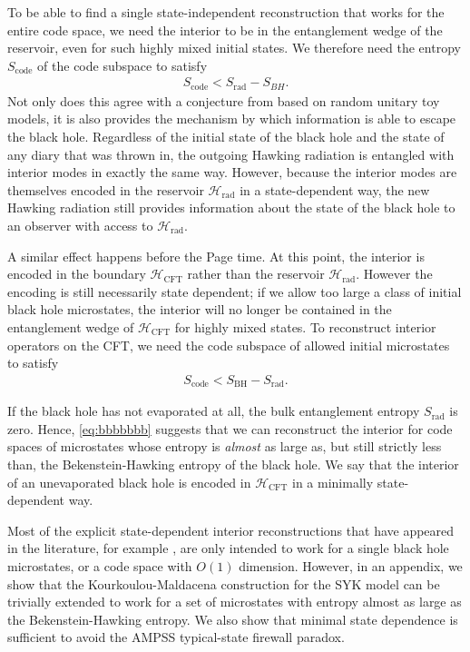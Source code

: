 \documentclass[11pt,a4paper]{article}
\newcommand{\Srad}{S_\text{rad} }
\begin{document}
To be able to find a single state-independent reconstruction that works for the entire code space, we need the interior to be in the entanglement wedge of the reservoir, even for such highly mixed initial states. We therefore need the entropy $S_\text{code}$ of the code subspace to satisfy
\begin{align}
S_\text{code} < \Srad - S_{BH}.
\end{align}
Not only does this agree with a conjecture from \cite{hayden2018learning} based on random unitary toy models, it is also provides the mechanism by which information is able to escape the black hole. Regardless of the initial state of the black hole and the state of any diary that was thrown in, the outgoing Hawking radiation is entangled with interior modes in exactly the same way. However, because the interior modes are themselves encoded in the reservoir $\mathcal{H}_\text{rad}$ in a state-dependent way, the new Hawking radiation still provides information about the state of the black hole to an observer with access to $\mathcal{H}_\text{rad}$.

A similar effect happens before the Page time. At this point, the interior is encoded in the boundary $\mathcal{H}_\text{CFT}$ rather than the reservoir $\mathcal{H}_\text{rad}$. However the encoding is still necessarily state dependent; if we allow too large a class of initial black hole microstates, the interior will no longer be contained in the entanglement wedge of $\mathcal{H}_\text{CFT}$ for highly mixed states. To reconstruct interior operators on the CFT, we need the code subspace of allowed initial microstates to satisfy
\begin{align} \label{eq:bbbbbbb}
S_\text{code} < S_\text{BH} - \Srad.
\end{align}

If the black hole has not evaporated at all, the bulk entanglement entropy $\Srad$ is zero. Hence, \eqref{eq:bbbbbbb} suggests that we can reconstruct the interior for code spaces of microstates whose entropy is \emph{almost} as large as, but still strictly less than, the Bekenstein-Hawking entropy of the black hole. We say that the interior of an unevaporated black hole is encoded in $\mathcal{H}_\text{CFT}$ in a minimally state-dependent way.

Most of the explicit state-dependent interior reconstructions that have appeared in the literature, for example \cite{papadodimas2013infalling, papadodimas2014state, kourkoulou2017pure, de2018interior}, are only intended to work for a single black hole microstates, or a code space with $O(1)$ dimension. However, in an appendix, we show that the Kourkoulou-Maldacena construction for the SYK model \cite{kourkoulou2017pure} can be trivially extended to work for  a set of microstates with entropy almost as large as the Bekenstein-Hawking entropy. We also show that minimal state dependence is sufficient to avoid the AMPSS typical-state firewall paradox.
\end{document}
